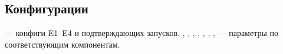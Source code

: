 \subsection*{Конфигурации }

\noindent\mbox{\textbf{}} --- конфиги E1--E4 и
подтверждающих запусков.\quad
\mbox{\textbf{}}, \mbox{\textbf{}},
\mbox{\textbf{}}, \mbox{\textbf{}},
\mbox{\textbf{}}, \mbox{\textbf{}},
\mbox{\textbf{}}, \mbox{\textbf{}}
--- параметры по соответствующим компонентам.

\endgroup
